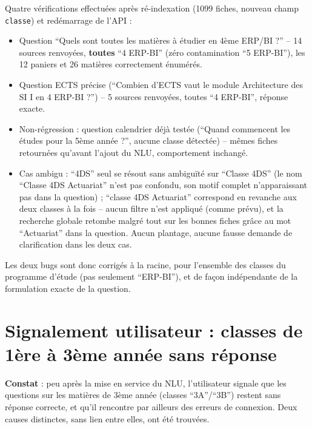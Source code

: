 \documentclass[11pt,a4paper]{report}
\begin{document}
\begin{statutfait}
Quatre vérifications effectuées après ré-indexation (1099 fiches, nouveau champ
\texttt{classe}) et redémarrage de l'API :
\begin{itemize}
    \item Question ``Quels sont toutes les matières à étudier en 4ème
    ERP/BI ?'' -- 14 sources renvoyées, \textbf{toutes} ``4 ERP-BI'' (zéro
    contamination ``5 ERP-BI''), les 12 paniers et 26 matières correctement
    énumérés.
    \item Question ECTS précise (``Combien d'ECTS vaut le module Architecture
    des SI I en 4 ERP-BI ?'') -- 5 sources renvoyées, toutes ``4 ERP-BI'',
    réponse exacte.
    \item Non-régression : question calendrier déjà testée (``Quand
    commencent les études pour la 5ème année ?'', aucune classe détectée) --
    mêmes fiches retournées qu'avant l'ajout du NLU, comportement inchangé.
    \item Cas ambigu : ``4DS'' seul se résout sans ambiguïté sur ``Classe
    4DS'' (le nom ``Classe 4DS Actuariat'' n'est pas confondu, son motif
    complet n'apparaissant pas dans la question) ; ``classe 4DS Actuariat''
    correspond en revanche aux deux classes à la fois -- aucun filtre n'est
    appliqué (comme prévu), et la recherche globale retombe malgré tout sur
    les bonnes fiches grâce au mot ``Actuariat'' dans la question. Aucun
    plantage, aucune fausse demande de clarification dans les deux cas.
\end{itemize}
Les deux bugs sont donc corrigés à la racine, pour l'ensemble des classes du
programme d'étude (pas seulement ``ERP-BI''), et de façon indépendante de la
formulation exacte de la question.
\end{statutfait}

\section{Signalement utilisateur : classes de 1ère à 3ème année sans réponse}

\textbf{Constat} : peu après la mise en service du NLU, l'utilisateur signale
que les questions sur les matières de 3ème année (classes ``3A''/``3B'')
restent sans réponse correcte, et qu'il rencontre par ailleurs des erreurs de
connexion. Deux causes distinctes, sans lien entre elles, ont été trouvées.
\end{document}
